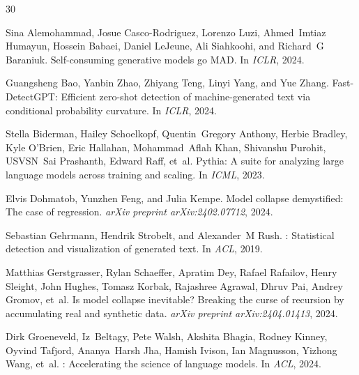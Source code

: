 \documentclass[11pt,a4paper]{article}
\begin{document}
\begin{thebibliography}{30}

Sina Alemohammad, Josue Casco-Rodriguez, Lorenzo Luzi, Ahmed~Imtiaz Humayun, Hossein Babaei, Daniel LeJeune, Ali Siahkoohi, and Richard~G Baraniuk.
\newblock Self-consuming generative models go {MAD}.
\newblock In \emph{ICLR}, 2024.

Guangsheng Bao, Yanbin Zhao, Zhiyang Teng, Linyi Yang, and Yue Zhang.
\newblock Fast-{D}etect{GPT}: Efficient zero-shot detection of machine-generated text via conditional probability curvature.
\newblock In \emph{ICLR}, 2024.

Stella Biderman, Hailey Schoelkopf, Quentin~Gregory Anthony, Herbie Bradley, Kyle O'Brien, Eric Hallahan, Mohammad~Aflah Khan, Shivanshu Purohit, USVSN~Sai Prashanth, Edward Raff, et~al.
\newblock Pythia: A suite for analyzing large language models across training and scaling.
\newblock In \emph{ICML}, 2023.

Elvis Dohmatob, Yunzhen Feng, and Julia Kempe.
\newblock Model collapse demystified: The case of regression.
\newblock \emph{arXiv preprint arXiv:2402.07712}, 2024.

Sebastian Gehrmann, Hendrik Strobelt, and Alexander~M Rush.
: Statistical detection and visualization of generated text.
\newblock In \emph{ACL}, 2019.

Matthias Gerstgrasser, Rylan Schaeffer, Apratim Dey, Rafael Rafailov, Henry Sleight, John Hughes, Tomasz Korbak, Rajashree Agrawal, Dhruv Pai, Andrey Gromov, et~al.
\newblock Is model collapse inevitable? {B}reaking the curse of recursion by accumulating real and synthetic data.
\newblock \emph{arXiv preprint arXiv:2404.01413}, 2024.

Dirk Groeneveld, Iz~Beltagy, Pete Walsh, Akshita Bhagia, Rodney Kinney, Oyvind Tafjord, Ananya~Harsh Jha, Hamish Ivison, Ian Magnusson, Yizhong Wang, et~al.
: Accelerating the science of language models.
\newblock In \emph{ACL}, 2024.


\end{thebibliography}
\end{document}
